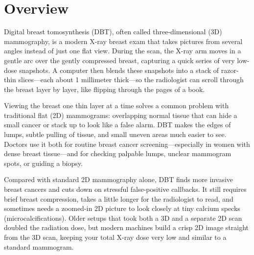 \label{ch:infographic-dbt}

\section{Overview}

Digital breast tomosynthesis (DBT), often called three-dimensional (3D) mammography, is a modern X-ray breast exam that takes pictures from several angles instead of just one flat view. During the scan, the X-ray arm moves in a gentle arc over the gently compressed breast, capturing a quick series of very low-dose snapshots. A computer then blends these snapshots into a stack of razor-thin slices---each about 1 millimeter thick---so the radiologist can scroll through the breast layer by layer, like flipping through the pages of a book.

Viewing the breast one thin layer at a time solves a common problem with traditional flat (2D) mammograms: overlapping normal tissue that can hide a small cancer or stack up to look like a false alarm. DBT makes the edges of lumps, subtle pulling of tissue, and small uneven areas much easier to see. Doctors use it both for routine breast cancer screening---especially in women with dense breast tissue---and for checking palpable lumps, unclear mammogram spots, or guiding a biopsy.

Compared with standard 2D mammography alone, DBT finds more invasive breast cancers and cuts down on stressful false-positive callbacks. It still requires brief breast compression, takes a little longer for the radiologist to read, and sometimes needs a zoomed-in 2D picture to look closely at tiny calcium specks (microcalcifications). Older setups that took both a 3D and a separate 2D scan doubled the radiation dose, but modern machines build a crisp 2D image straight from the 3D scan, keeping your total X-ray dose very low and similar to a standard mammogram.

